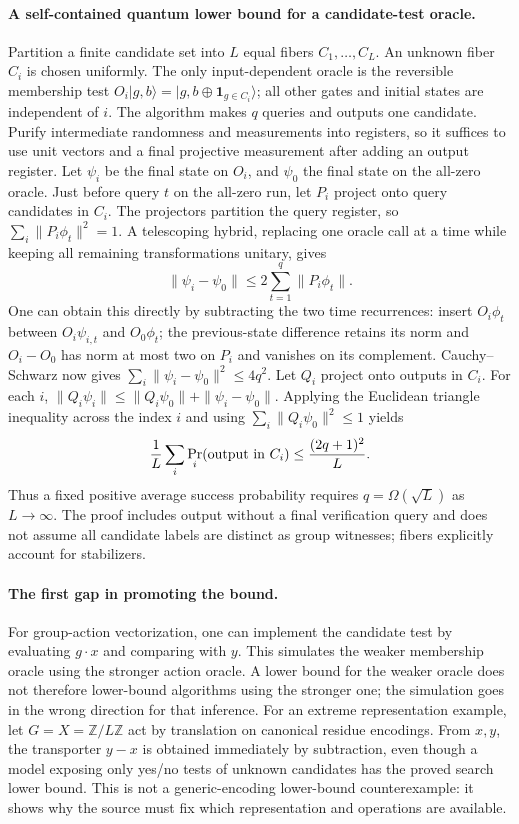 \documentclass[11pt]{article}
\begin{document}
\paragraph{A self-contained quantum lower bound for a candidate-test oracle.}
Partition a finite candidate set into $L$ equal fibers $C_1,\ldots,C_L$.
An unknown fiber $C_i$ is chosen uniformly. The only input-dependent oracle
is the reversible membership test
$O_i|g,b\rangle=|g,b\mathbin\oplus\mathbf1_{g\in C_i}\rangle$;
all other gates and initial states are independent of $i$. The algorithm
makes $q$ queries and outputs one candidate. Purify intermediate randomness
and measurements into registers, so it suffices to use unit vectors and a
final projective measurement after adding an output register.
Let $\psi_i$ be the final state on $O_i$, and $\psi_0$ the final state on
the all-zero oracle. Just before query $t$ on the all-zero run, let
$P_i$ project onto query candidates in $C_i$. The projectors partition the
query register, so $\sum_i\|P_i\phi_t\|^2=1$.
A telescoping hybrid, replacing one oracle call at a time while keeping all
remaining transformations unitary, gives
\[
\|\psi_i-\psi_0\|\le2\sum_{t=1}^q\|P_i\phi_t\|.
\]
One can obtain this directly by subtracting the two time recurrences: insert
$O_i\phi_t$ between $O_i\psi_{i,t}$ and $O_0\phi_t$; the previous-state
difference retains its norm and $O_i-O_0$ has norm at most two on $P_i$ and
vanishes on its complement. Cauchy--Schwarz now gives
$\sum_i\|\psi_i-\psi_0\|^2\le4q^2$.
Let $Q_i$ project onto outputs in $C_i$. For each $i$,
$\|Q_i\psi_i\|\le\|Q_i\psi_0\|+\|\psi_i-\psi_0\|$.
Applying the Euclidean triangle inequality across the index $i$ and using
$\sum_i\|Q_i\psi_0\|^2\le1$ yields
\[
\frac1L\sum_i\Pr_i(\hbox{output in }C_i)
\le\frac{(2q+1)^2}{L}.
\]
Thus a fixed positive average success probability requires
$q=\Omega(\sqrt L)$ as $L\to\infty$. The proof includes output without a
final verification query and does not assume all candidate labels are distinct
as group witnesses; fibers explicitly account for stabilizers.

\paragraph{The first gap in promoting the bound.}
For group-action vectorization, one can implement the candidate test by
evaluating $g\cdot x$ and comparing with $y$. This simulates the weaker
membership oracle using the stronger action oracle. A lower bound for the
weaker oracle does not therefore lower-bound algorithms using the stronger
one; the simulation goes in the wrong direction for that inference.
For an extreme representation example, let $G=X=\mathbb Z/L\mathbb Z$ act
by translation on canonical residue encodings. From $x,y$, the transporter
$y-x$ is obtained immediately by subtraction, even though a model exposing
only yes/no tests of unknown candidates has the proved search lower bound.
This is not a generic-encoding lower-bound counterexample: it shows why the
source must fix which representation and operations are available.
\end{document}
